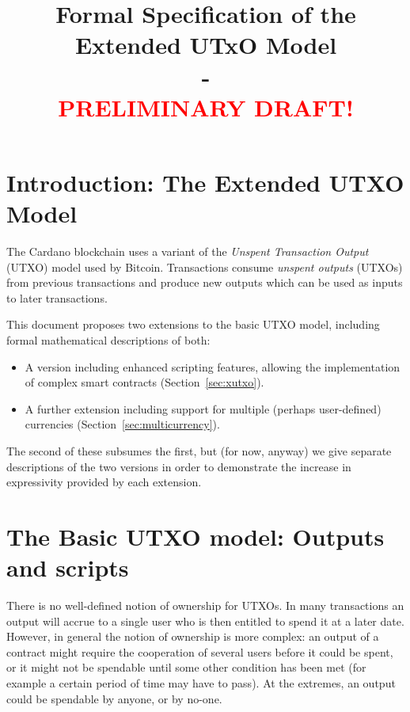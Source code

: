 \documentclass[a4paper]{article}
\newcommand{\red}[1]{\textcolor{red}{#1}}
\theoremstyle{definition}  %
\begin{document}
\title{Formal Specification of the Extended UTxO Model\\- \\
  \red{\textsf{PRELIMINARY DRAFT!}}}
\maketitle

\thispagestyle{plain}
\pagestyle{plain}

\section{Introduction: The Extended UTXO Model}
\label{sec:intro}
The Cardano blockchain uses a variant of the \textit{Unspent
  Transaction Output} (UTXO) model used by Bitcoin.  Transactions
consume \textit{unspent outputs} (UTXOs) from previous transactions and
produce new outputs which can be used as inputs to later transactions.

This document proposes two extensions to the basic UTXO model, including
formal mathematical descriptions of both:
\begin{itemize}
\item A version including enhanced scripting features, allowing the
  implementation of complex smart contracts (Section~\ref{sec:xutxo}).
\item A further extension including support for multiple (perhaps user-defined)
  currencies (Section~\ref{sec:multicurrency}).
\end{itemize}

\noindent The second of these subsumes the first, but (for now, anyway) we give
separate descriptions of the two versions in order to demonstrate the
increase in expressivity provided by each extension.

\section{The Basic UTXO model: Outputs and scripts}
\label{sec:utxo-intro}

There is no well-defined notion of ownership for UTXOs.  In many
transactions an output will accrue to a single user who is then
entitled to spend it at a later date.  However, in general the notion
of ownership is more complex: an output of a contract might require
the cooperation of several users before it could be spent, or it might
not be spendable until some other condition has been met (for example
a certain period of time may have to pass).  At the extremes, an
output could be spendable by anyone, or by no-one.
\end{document}
